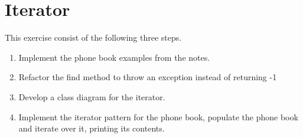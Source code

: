 \documentclass{article}
\begin{document}
\pagebreak
\section{Iterator}
This exercise consist of the following three steps.
\begin{enumerate}
  \item Implement the phone book examples from the notes.
  \item Refactor the find method to throw an exception instead of returning -1
  \item Develop a class diagram for the iterator.
  \item Implement the iterator pattern for the phone book, populate the phone book and iterate over it, printing its contents.
\end{enumerate}
\end{document}

